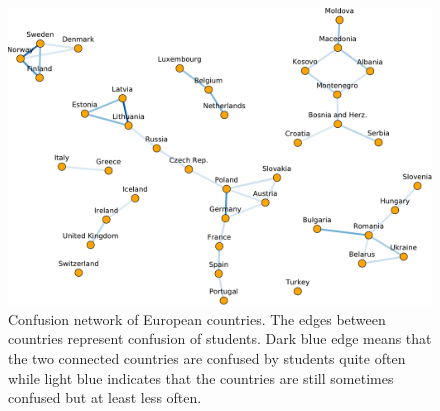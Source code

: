 \begin{figure}[htbp]
  \centering
  \includegraphics[width=\textwidth]{img/confusion-network}
  \caption{Confusion network of European countries. The edges between countries represent confusion of students. Dark blue edge means that the two connected countries are confused by students quite often while light blue indicates that the countries are still sometimes confused but at least less often.}
  \label{fig:confusion-network}
\end{figure}
